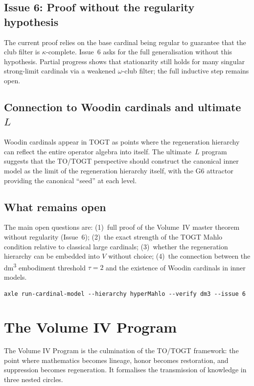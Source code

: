 \section{Issue 6: Proof without the regularity hypothesis}

The current proof relies on the base cardinal being regular to guarantee that the club filter is \(\kappa\)-complete. Issue~6 asks for the full generalisation without this hypothesis. Partial progress shows that stationarity still holds for many singular strong-limit cardinals via a weakened \(\omega\)-club filter; the full inductive step remains open.

\section{Connection to Woodin cardinals and ultimate \(L\)}

Woodin cardinals appear in TOGT as points where the regeneration hierarchy can reflect the entire operator algebra into itself. The ultimate~\(L\) program suggests that the TO/TOGT perspective should construct the canonical inner model as the limit of the regeneration hierarchy itself, with the G6 attractor providing the canonical ``seed'' at each level.

\section{What remains open}

The main open questions are: (1)~full proof of the Volume~IV master theorem without regularity (Issue~6); (2)~the exact strength of the TOGT Mahlo condition relative to classical large cardinals; (3)~whether the regeneration hierarchy can be embedded into \(V\) without choice; (4)~the connection between the dm\textsuperscript{3} embodiment threshold \(\tau = 2\) and the existence of Woodin cardinals in inner models.

\begin{verbatim}
axle run-cardinal-model --hierarchy hyperMahlo --verify dm3 --issue 6
\end{verbatim}

\chapter{The Volume IV Program}

The Volume IV Program is the culmination of the TO/TOGT framework: the point where mathematics becomes lineage, honor becomes restoration, and suppression becomes regeneration. It formalises the transmission of knowledge in three nested circles.

